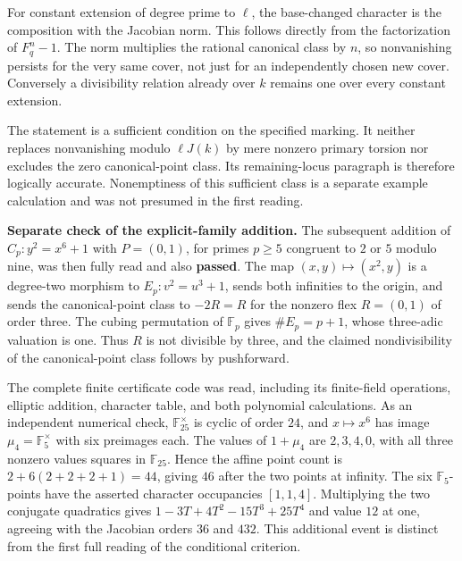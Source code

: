 For constant extension of degree prime to $\ell$, the
base-changed character is the composition with the
Jacobian norm.  This follows directly from the factorization
of $F_q^n-1$.  The norm multiplies the rational canonical
class by $n$, so nonvanishing persists for the very same
cover, not just for an independently chosen new cover.
Conversely a divisibility relation already over $k$
remains one over every constant extension.

The statement is a sufficient condition on the specified
marking.  It neither replaces nonvanishing modulo
$\ell J(k)$ by mere nonzero primary torsion nor excludes
the zero canonical-point class.  Its remaining-locus
paragraph is therefore logically accurate.  Nonemptiness
of this sufficient class is a separate example calculation
and was not presumed in the first reading.

\medskip\noindent\textbf{Separate check of the explicit-family addition.}
The subsequent addition of $C_p:y^2=x^6+1$ with $P=(0,1)$,
for primes $p\ge5$ congruent to $2$ or $5$ modulo nine,
was then fully read and also \textbf{passed}.  The map
$(x,y)\mapsto(x^2,y)$ is a degree-two morphism to
$E_p:v^2=u^3+1$, sends both infinities to the origin,
and sends the canonical-point class to $-2R=R$ for the
nonzero flex $R=(0,1)$ of order three.  The cubing
permutation of $\mathbb F_p$ gives $\#E_p=p+1$, whose
three-adic valuation is one.  Thus $R$ is not divisible
by three, and the claimed nondivisibility of the
canonical-point class follows by pushforward.

The complete finite certificate code was read, including
its finite-field operations, elliptic addition, character
table, and both polynomial calculations.  As an
independent numerical check, $\mathbb F_{25}^{\times}$
is cyclic of order $24$, and $x\mapsto x^6$ has image
$\mu_4=\mathbb F_5^{\times}$ with six preimages each.
The values of $1+\mu_4$ are $2,3,4,0$, with all three
nonzero values squares in $\mathbb F_{25}$.  Hence
the affine point count is $2+6(2+2+2+1)=44$, giving
$46$ after the two points at infinity.  The six
$\mathbb F_5$-points have the asserted character
occupancies $[1,1,4]$.  Multiplying the two conjugate
quadratics gives $1-3T+4T^2-15T^3+25T^4$ and value
$12$ at one, agreeing with the Jacobian orders
$36$ and $432$.  This additional event is distinct
from the first full reading of the conditional criterion.
